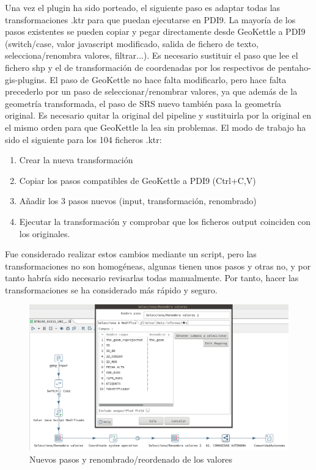 Una vez el plugin ha sido porteado, el siguiente paso es adaptar todas las transformaciones .ktr para que puedan
ejecutarse en PDI9. La mayoría de los pasos existentes se pueden copiar y pegar directamente desde
GeoKettle a PDI9 (switch/case, valor javascript modificado, salida de fichero de texto, selecciona/renombra
valores, filtrar...). Es necesario sustituir el paso que lee el fichero shp y el de transformación de coordenadas
por los respectivos de pentaho-gis-plugins. El paso de GeoKettle no hace falta modificarlo, pero hace falta
precederlo por un paso de seleccionar/renombrar valores, ya que además de la geometría transformada, el paso de
SRS nuevo también pasa la geometría original. Es necesario quitar la original del pipeline y sustituirla por la
original en el mismo orden para que GeoKettle la lea sin problemas. El modo de trabajo ha sido el siguiente para
los 104 ficheros .ktr:

\begin{enumerate}
    \item Crear la nueva transformación
    \item Copiar los pasos compatibles de GeoKettle a PDI9 (Ctrl+C,V)
    \item Añadir los 3 pasos nuevos (input, transformación, renombrado)
    \item Ejecutar la transformación y comprobar que los ficheros output coinciden con los originales.
\end{enumerate}

Fue considerado realizar estos cambios mediante un script, pero las transformaciones no son homogéneas, algunas
tienen unos pasos y otras no, y por tanto habría sido necesario revisarlas todas manualmente. Por tanto, hacer
las transformaciones se ha considerado más rápido y seguro.

\begin{figure}[H]
    \includegraphics[width=\textwidth]{images/renombra-geom.png}
    \centering
    \caption{Nuevos pasos y renombrado/reordenado de los valores}
    \label{fig:renombra-geom}
\end{figure}

